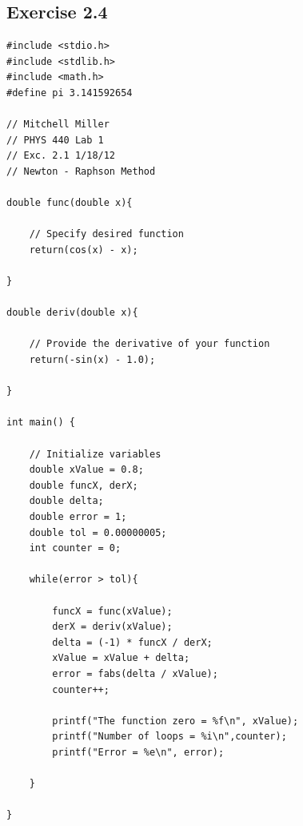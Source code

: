 \documentclass[12pt]{article}
\begin{document}
\subsection{Exercise 2.4}
\begin{verbatim}
#include <stdio.h>
#include <stdlib.h>
#include <math.h>
#define pi 3.141592654

// Mitchell Miller
// PHYS 440 Lab 1
// Exc. 2.1 1/18/12
// Newton - Raphson Method

double func(double x){

	// Specify desired function
	return(cos(x) - x);

}

double deriv(double x){

	// Provide the derivative of your function
	return(-sin(x) - 1.0);

}

int main() {

	// Initialize variables
	double xValue = 0.8;
	double funcX, derX;
	double delta;
	double error = 1;
	double tol = 0.00000005;
	int counter = 0;

	while(error > tol){

		funcX = func(xValue);
		derX = deriv(xValue);
		delta = (-1) * funcX / derX;
		xValue = xValue + delta;
		error = fabs(delta / xValue);
		counter++;
		
		printf("The function zero = %f\n", xValue);
		printf("Number of loops = %i\n",counter);
		printf("Error = %e\n", error);

	}

}
\end{verbatim}
\end{document}
